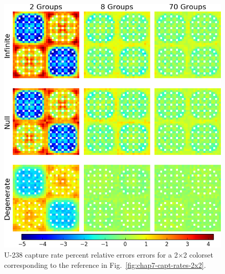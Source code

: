 \begin{appendices}
\begin{figure}[h!]
\centering
\includegraphics[width=\linewidth]{figures/quantification/appendix/2x2/capt-err}
\vspace{2mm}
\caption[U-238 capture rate errors for a 2$\times$2 colorset]{U-238 capture rate percent relative errors errors for a 2$\times$2 colorset corresponding to the reference in Fig.~\ref{fig:chap7-capt-rates-2x2}.}
\label{fig:quantify-2x2-capt-err}
\end{figure}

\clearpage


\end{appendices}
